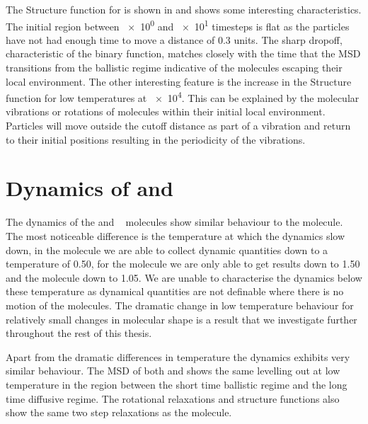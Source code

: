 The Structure function for \sone is shown in  and shows some interesting characteristics. The initial region between \num{e0} and \num{e1} timesteps is flat as the particles have not had enough time to move a distance of \num{0.3} units. The sharp dropoff, characteristic of the binary function, matches closely with the time that the MSD transitions from the ballistic regime indicative of the molecules escaping their local environment. The other interesting feature is the increase in the Structure function for low temperatures at \num{e4}. This can be explained by the molecular vibrations or rotations of molecules within their initial local environment. Particles will move outside the cutoff distance as part of a vibration and return to their initial positions resulting in the periodicity of the vibrations.

\section{Dynamics of \scon and \tri}

The dynamics of the \scon {} and \tri~ molecules show similar behaviour to the \sone molecule. The most noticeable difference is the temperature at which the dynamics slow down, in the \sone molecule we are able to collect dynamic quantities down to a temperature of \num{0.50}, for the \scon molecule we are only able to get results down to \num{1.50} and the \tri molecule down to \num{1.05}. We are unable to characterise the dynamics below these temperature as dynamical quantities are not definable where there is no motion of the molecules. The dramatic change in low temperature behaviour for relatively small changes in molecular shape is a result that we investigate further throughout the rest of this thesis.

Apart from the dramatic differences in temperature the dynamics exhibits very similar behaviour. The MSD of both \scon {} and \tri {} shows the same levelling out at low temperature in the region between the short time ballistic regime and the long time diffusive regime. The rotational relaxations and structure functions also show the same two step relaxations as the \sone molecule.

